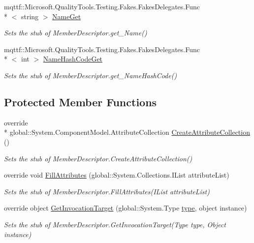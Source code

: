 \begin{DoxyCompactItemize}
mqttf\-::\-Microsoft.\-Quality\-Tools.\-Testing.\-Fakes.\-Fakes\-Delegates.\-Func\\*
$<$ string $>$ \hyperlink{class_system_1_1_component_model_1_1_fakes_1_1_stub_member_descriptor_a022c471ebd7d2d2bf6cb9883d4eca7f1}{Name\-Get}
\begin{DoxyCompactList}\small\item\em Sets the stub of Member\-Descriptor.\-get\-\_\-\-Name()\end{DoxyCompactList}\item 
mqttf\-::\-Microsoft.\-Quality\-Tools.\-Testing.\-Fakes.\-Fakes\-Delegates.\-Func\\*
$<$ int $>$ \hyperlink{class_system_1_1_component_model_1_1_fakes_1_1_stub_member_descriptor_affed3480e2a86f0eaa3ee6dcd40e7644}{Name\-Hash\-Code\-Get}
\begin{DoxyCompactList}\small\item\em Sets the stub of Member\-Descriptor.\-get\-\_\-\-Name\-Hash\-Code()\end{DoxyCompactList}\end{DoxyCompactItemize}
\subsection*{Protected Member Functions}
\begin{DoxyCompactItemize}
\item 
override \\*
global\-::\-System.\-Component\-Model.\-Attribute\-Collection \hyperlink{class_system_1_1_component_model_1_1_fakes_1_1_stub_member_descriptor_a1fde0d69ba9a0d1126842598083eb718}{Create\-Attribute\-Collection} ()
\begin{DoxyCompactList}\small\item\em Sets the stub of Member\-Descriptor.\-Create\-Attribute\-Collection()\end{DoxyCompactList}\item 
override void \hyperlink{class_system_1_1_component_model_1_1_fakes_1_1_stub_member_descriptor_a269ab36142edd0ebc03e3e603dd596f9}{Fill\-Attributes} (global\-::\-System.\-Collections.\-I\-List attribute\-List)
\begin{DoxyCompactList}\small\item\em Sets the stub of Member\-Descriptor.\-Fill\-Attributes(\-I\-List attribute\-List)\end{DoxyCompactList}\item 
override object \hyperlink{class_system_1_1_component_model_1_1_fakes_1_1_stub_member_descriptor_aadee5d5747880b7e87c4beead21852e5}{Get\-Invocation\-Target} (global\-::\-System.\-Type \hyperlink{jquery-1_810_82-vsdoc_8js_a3940565e83a9bfd10d95ffd27536da91}{type}, object instance)
\begin{DoxyCompactList}\small\item\em Sets the stub of Member\-Descriptor.\-Get\-Invocation\-Target(\-Type type, Object instance)\end{DoxyCompactList}\end{DoxyCompactItemize}
